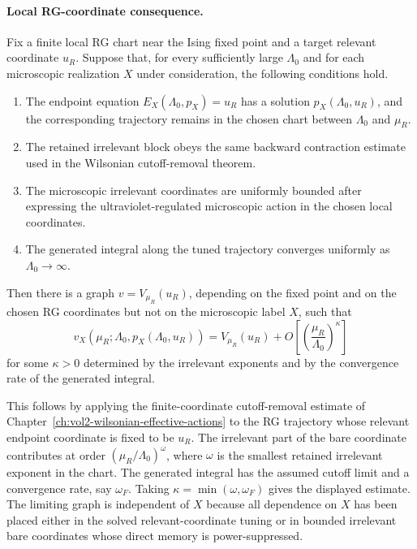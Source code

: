 \paragraph{Local RG-coordinate consequence.}
Fix a finite local RG chart near the Ising fixed point and a target relevant
coordinate \(u_R\).  Suppose that, for every sufficiently large
\(\Lambda_0\) and for each microscopic realization \(X\) under consideration,
the following conditions hold.
\begin{enumerate}[label=(\roman*)]
  \item The endpoint equation
  \(E_X(\Lambda_0,p_X)=u_R\) has a solution \(p_X(\Lambda_0,u_R)\), and the
  corresponding trajectory remains in the chosen chart between
  \(\Lambda_0\) and \(\mu_R\).
  \item The retained irrelevant block obeys the same backward contraction
  estimate used in the Wilsonian cutoff-removal theorem.
  \item The microscopic irrelevant coordinates are uniformly bounded after
  expressing the ultraviolet-regulated microscopic action in the chosen local
  coordinates.
  \item The generated integral along the tuned trajectory converges uniformly
  as \(\Lambda_0\to\infty\).
\end{enumerate}
Then there is a graph \(v=V_{\mu_R}(u_R)\), depending on the fixed point and
on the chosen RG coordinates but not on the microscopic label \(X\), such that
\[
  v_X(\mu_R;\Lambda_0,p_X(\Lambda_0,u_R))
  =
  V_{\mu_R}(u_R)
  +
  O\!\left[
    \left(\frac{\mu_R}{\Lambda_0}\right)^\kappa
  \right]
\]
for some \(\kappa>0\) determined by the irrelevant exponents and by the
convergence rate of the generated integral.

This follows by applying the finite-coordinate cutoff-removal estimate of
Chapter~\ref{ch:vol2-wilsonian-effective-actions} to the RG trajectory whose
relevant endpoint coordinate is fixed to be \(u_R\).  The irrelevant part of
the bare coordinate contributes at order
\((\mu_R/\Lambda_0)^\omega\), where \(\omega\) is the smallest retained
irrelevant exponent in the chart.  The generated integral has the assumed
cutoff limit and a convergence rate, say \(\omega_F\).  Taking
\(\kappa=\min(\omega,\omega_F)\) gives the displayed estimate.  The limiting
graph is independent of \(X\) because all dependence on \(X\) has been placed
either in the solved relevant-coordinate tuning or in bounded irrelevant
bare coordinates whose direct memory is power-suppressed.

